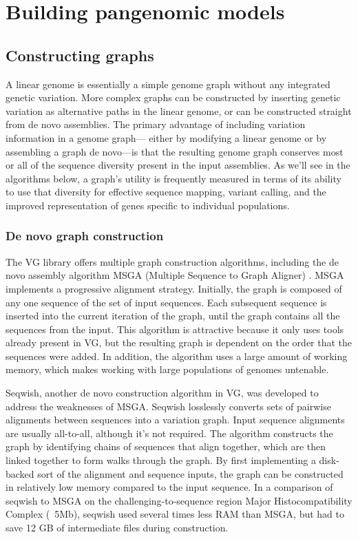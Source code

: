 \section{Building pangenomic models}

\subsection{Constructing graphs} 

A linear genome is essentially a simple genome graph without any integrated genetic variation. 
More complex graphs can be constructed by inserting genetic variation as alternative paths in the linear genome, or can be constructed straight from de novo assemblies. 
The primary advantage of including variation information in a genome graph--- either by modifying a linear genome or by assembling a graph de novo---is that the resulting genome graph conserves most or all of the sequence diversity present in the input assemblies. 
As we'll see in the algorithms below, a graph's utility is frequently measured in terms of its ability to use that diversity for effective sequence mapping, variant calling, and the improved representation of genes specific to individual populations.

\subsubsection{De novo graph construction}

The VG library offers multiple graph construction algorithms, including the de novo assembly algorithm MSGA (Multiple Sequence to Graph Aligner) \cite{Garrison_2018,Novak_2017a}. 
MSGA implements a progressive alignment strategy.
Initially, the graph is composed of any one sequence of the set of input sequences.
Each subsequent sequence is inserted into the current iteration of the graph, until the graph contains all the sequences from the input.
This algorithm is attractive because it only uses tools already present in VG, but the resulting graph is dependent on the order that the sequences were added.
In addition, the algorithm uses a large amount of working memory, which makes working with large populations of genomes untenable.



Seqwish, another de novo construction algorithm in VG, was developed to address the weaknesses of MSGA.
Seqwish losslessly converts sets of pairwise alignments between sequences into a variation graph.
Input sequence alignments are usually all-to-all, although it's not required.
The algorithm constructs the graph by identifying chains of sequences that align together, which are then linked together to form walks through the graph.
By first implementing a disk-backed sort of the alignment and sequence inputs, the graph can be constructed in relatively low memory compared to the input sequence.
In a comparison of seqwish to MSGA on the challenging-to-sequence region Major Histocompatibility Complex (~5Mb), seqwish used several times less RAM than MSGA, but had to save 12 GB of intermediate files during construction.


